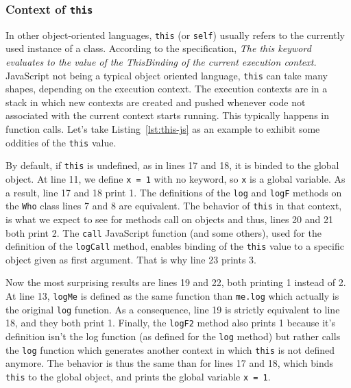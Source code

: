 \subsubsection{Context of {\texttt{this}}}%
\label{ssub:context_of_this}

In other object-oriented languages,
\verb|this| (or \verb|self|) usually refers to the currently used instance of a class.
According to the specification,
\textit{The this keyword evaluates to the value of the ThisBinding of the current execution context.} 
JavaScript not being a typical object oriented language,
\verb|this| can take many shapes, depending on the execution context.
The execution contexts are in a stack in which new contexts are created and pushed
whenever code not associated with the current context starts running.
This typically happens in function calls.
Let's take Listing~\ref{lst:this-js} as an example
to exhibit some oddities of the \verb|this| value.


By default, if \verb|this| is undefined, as in lines 17 and 18,
it is binded to the global object.
At line 11, we define \verb|x = 1| with no keyword,
so \verb|x| is a global variable.
As a result, line 17 and 18 print 1.
The definitions of the \verb|log| and \verb|logF| methods on the \verb|Who| class
lines 7 and 8 are equivalent. The behavior of \verb|this| in that context,
is what we expect to see for methods call on objects and thus,
lines 20 and 21 both print 2.
The \verb|call| JavaScript function (and some others),
used for the definition of the \verb|logCall| method,
enables binding of the \verb|this| value to a specific object given as first argument.
That is why line 23 prints 3.

Now the most surprising results are lines 19 and 22, both printing 1 instead of 2.
At line 13, \verb|logMe| is defined as the same function than \verb|me.log| which
actually is the original \verb|log| function.
As a consequence, line 19 is strictly equivalent to line 18, and they both print 1.
Finally, the \verb|logF2| method also prints 1 because it's definition isn't the log function
(as defined for the \verb|log| method) but rather calls the \verb|log| function which
generates another context in which \verb|this| is not defined anymore.
The behavior is thus the same than for lines 17 and 18, which binds \verb|this| to the global object,
and prints the global variable \verb|x = 1|.

